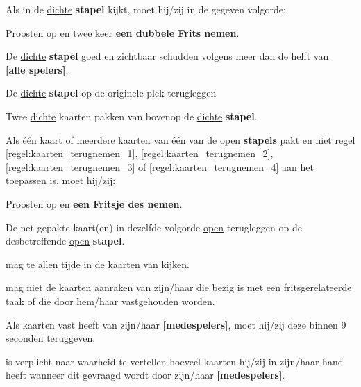 \vervolgLijst{}
    \item Als \eenSpeler in de \ul{dichte} \textbf{stapel} kijkt, moet hij/zij in de gegeven volgorde:
    \puntLijst{}
        \item Proosten op  en \ul{twee keer} \textbf{een dubbele Frits nemen}\footnotemark[2]. 
        \item De \ul{dichte} \textbf{stapel} goed en zichtbaar schudden volgens meer dan de helft van \\ \textbf{[alle spelers]}.
        \item De \ul{dichte} \textbf{stapel} op de originele plek terugleggen
        \item Twee \ul{dichte} kaarten pakken van bovenop de \ul{dichte} \textbf{stapel}.
    \eindPuntLijst{}
    \label{regel:kijken_in_dichte_stapel}
\eindLijst{}  

\vervolgLijst{}
    \item Als \eenSpeler één kaart of meerdere kaarten van één van de \ul{open} \textbf{stapels} pakt en niet regel \ref{regel:kaarten_terugnemen_1}, \ref{regel:kaarten_terugnemen_2}, \ref{regel:kaarten_terugnemen_3} of \ref{regel:kaarten_terugnemen_4} aan het toepassen is, moet hij/zij:
    \puntLijst{}
       \item Proosten op  en \textbf{een Fritsje des nemen}\footnotemark[3].
        \item De net gepakte kaart(en) in dezelfde volgorde \ul{open} terugleggen op de desbetreffende \ul{open} \textbf{stapel}.
    \eindPuntLijst{}
\eindLijst{}  


\vervolgLijst{}
    \item \EenSpeler mag te allen tijde in de kaarten van \alleSpelers kijken.
\eindLijst{}

\vervolgLijst{}
    \item \EenSpeler mag niet de kaarten aanraken van zijn/haar \medeSpelers die bezig is met een fritsgerelateerde taak of die door hem/haar vastgehouden worden.
\eindLijst{}  

\vervolgLijst{}
    \item Als \eenSpeler kaarten vast heeft van zijn/haar \textbf{[medespelers]}, moet hij/zij deze binnen 9 seconden teruggeven.
\eindLijst{}

\vervolgLijst{}
    \item \EenSpeler is verplicht naar waarheid te vertellen hoeveel kaarten hij/zij in zijn/haar hand heeft wanneer dit gevraagd wordt door zijn/haar \textbf{[medespelers]}.
\eindLijst{}   

